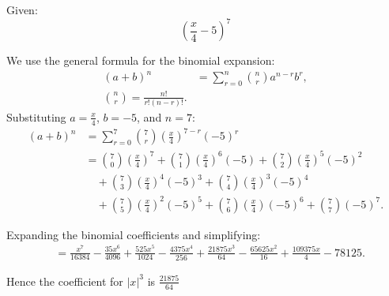 \documentclass{tufte-handout}
\begin{document}
\begin{question}

    Given:
    \[ \left(\frac{x}{4} - 5\right)^{7} \]
    
    We use the general formula for the binomial expansion:
    \begin{align*}
    ( a + b )^{n} &= \sum_{r=0}^{n} \binom{n}{r} a^{n-r} b^r, \\
    \binom{n}{r} = \frac{n!}{r!(n-r)!}.
    \end{align*}
    \vspace{3cm}   
    Substituting \( a = \frac{x}{4} \), \( b = -5 \), and \( n = 7 \):
    \begin{align*}
        (a + b)^n &= \sum_{r=0}^{7} \binom{7}{r} \left(\frac{x}{4}\right)^{7-r} (-5)^r \\
        &= \binom{7}{0}\left(\frac{x}{4}\right)^{7} + \binom{7}{1}\left(\frac{x}{4}\right)^{6}(-5) + \binom{7}{2}\left(\frac{x}{4}\right)^{5}(-5)^2 \\
        &\quad + \binom{7}{3}\left(\frac{x}{4}\right)^{4}(-5)^3 + \binom{7}{4}\left(\frac{x}{4}\right)^{3}(-5)^4 \\
        &\quad + \binom{7}{5}\left(\frac{x}{4}\right)^{2}(-5)^5 + \binom{7}{6}\left(\frac{x}{4}\right)(-5)^6 + \binom{7}{7}(-5)^7.
    \end{align*}

    \vspace{3cm}    


    Expanding the binomial coefficients and simplifying:
    \begin{align*}
        &= \frac{x^{7}}{16384} - \frac{35x^{6}}{4096} + \frac{525x^{5}}{1024} -
    \frac{4375x^{4}}{256} + \frac{21875x^{3}}{64} - \frac{65625x^{2}}{16} +
    \frac{109375x}{4} - 78125.
    \end{align*}

Hence the coefficient for \( \vert x \vert ^{3} \) is \( \frac{21875}{64} \)
    

\end{question}

\clearpage
\end{document}
